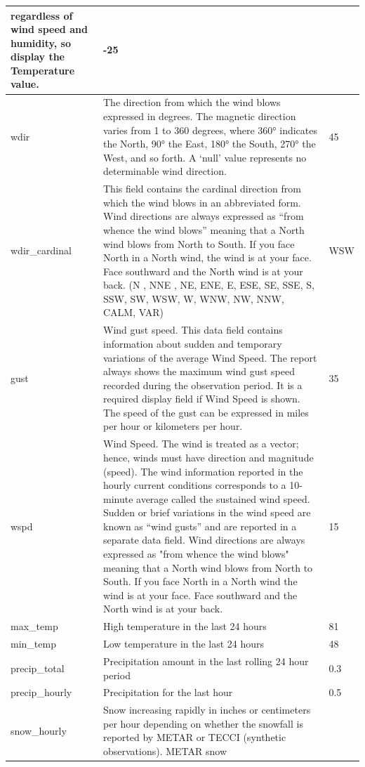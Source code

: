 \documentclass[paper=a4, fontsize=11pt, margin=1in]{scrartcl}
\numberwithin{equation}{section}		%
\numberwithin{figure}{section}			%
\numberwithin{table}{section}				%
\begin{document}
\begin{longtable}{|p{4.5cm}|p{7cm} |p{3cm}|}
regardless of wind speed and humidity, so display the Temperature value. & -25\\
\hline
wdir & The direction from which the wind blows expressed in degrees. The magnetic direction varies from 1 to 
360 degrees, where 360° indicates the North, 90° the East, 180° the South, 270° the West, and so 
forth.  A ‘null’ value  represents no determinable wind direction. & 45 \\
\hline
wdir\_cardinal & This field contains the cardinal direction from which the wind blows in an abbreviated form. Wind 
directions are always expressed as “from whence the wind blows” meaning that a North wind blows 
from North to South. If you face North in a North wind, the wind is at your face. Face southward and the 
North wind is at your back.
(N , NNE , NE, ENE, E, ESE, SE, 
SSE, S, SSW, SW, WSW, W, 
WNW, NW, NNW, CALM, VAR) & WSW \\
\hline
gust & Wind gust speed. 
This data field contains information about sudden and temporary variations of the average Wind Speed. 
The report always shows the maximum wind gust speed recorded during the observation period. It is a 
required display field if Wind Speed is shown. The speed of the gust can be expressed in miles per 
hour or kilometers per hour.  & 35\\
\hline
wspd & Wind Speed. 
The wind is treated as a vector; hence, winds must have direction and magnitude (speed). The wind 
information reported in the hourly current conditions corresponds to a 10-minute average called the 
sustained wind speed. Sudden or brief variations in the wind speed are known as “wind gusts” and are 
reported in a separate data field. 
Wind directions are always expressed as "from whence the wind blows" meaning that a North wind 
blows from North to South. If you face North in a North wind the wind is at your face. Face southward 
and the North wind is at your back.  & 15 \\
\hline
max\_temp & High temperature in the last 24 hours & 81 \\
\hline
min\_temp & Low temperature in the last 24 hours & 48\\
\hline
precip\_total & Precipitation amount in the last rolling 24 hour period & 0.3 \\
\hline
precip\_hourly & Precipitation for the last hour  & 0.5 \\
\hline
snow\_hourly & Snow increasing rapidly in inches or
centimeters per hour depending on whether
the snowfall is reported by METAR or TECCI
(synthetic observations). METAR snow

\end{longtable}
\end{document}
